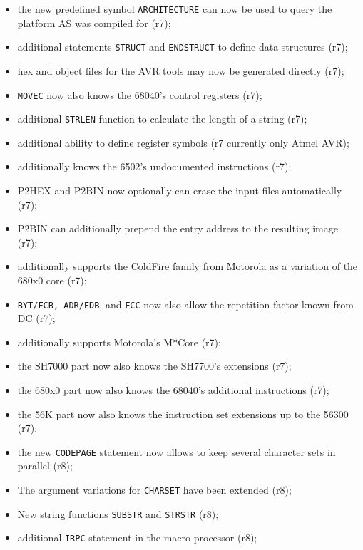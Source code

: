 \documentclass[12pt,twoside]{report}
\newcommand{\tty}[1]{{\tt #1}}
\newcommand{\asname}{{AS}}
\begin{document}
\begin{itemize}
{\begin{itemize}
      \item{the new predefined symbol \tty{ARCHITECTURE} can now be
            used to query the platform \asname{} was compiled for (r7);}
      \item{additional statements \tty{STRUCT} and \tty{ENDSTRUCT}
            to define data structures (r7);}
      \item{hex and object files for the AVR tools may now be generated
            directly (r7);}
      \item{\tty{MOVEC} now also knows the 68040's control registers
            (r7);}
      \item{additional \tty{STRLEN} function to calculate the length
            of a string (r7);}
      \item{additional ability to define register symbols (r7 currently
            only Atmel AVR);}
      \item{additionally knows the 6502's undocumented instructions (r7);}
      \item{P2HEX and P2BIN now optionally can erase the input files
            automatically (r7);}
      \item{P2BIN can additionally prepend the entry address to the
            resulting image (r7);}
      \item{additionally supports the ColdFire family from Motorola as a
            variation of the 680x0 core (r7);}
      \item{\tty{BYT/FCB, ADR/FDB}, and \tty{FCC} now also allow the
            repetition factor known from DC (r7);}
      \item{additionally supports Motorola's M*Core (r7);}
      \item{the SH7000 part now also knows the SH7700's
            extensions (r7);}
      \item{the 680x0 part now also knows the 68040's additional
            instructions (r7);}
      \item{the 56K part now also knows the instruction set extensions
            up to the 56300 (r7).}
      \item{the new \tty{CODEPAGE} statement now allows to keep several
            character sets in parallel (r8);}
      \item{The argument variations for \tty{CHARSET} have been extended
            (r8);}
      \item{New string functions \tty{SUBSTR} and \tty{STRSTR} (r8);}
      \item{additional \tty{IRPC} statement in the macro processor (r8);}

\end{itemize}}
\end{itemize}
\end{document}
